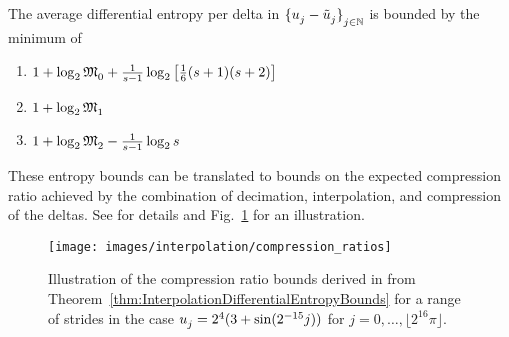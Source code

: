 \begin{theorem}
\label{thm:InterpolationDifferentialEntropyBounds}
The average differential entropy per delta in \(\InterpolationErrors\) is bounded by the minimum of
\begin{enumerate}[(1)]
\item \(1+\log_{2}\MaximumDifferenceGlobal{0}+\tfrac{1}{\stride-1}\log_{2}\big[\tfrac{1}{6}(\stride+1)(\stride+2)\big]\)
\item \(1+\log_{2}\MaximumDifferenceGlobal{1}\)
\item \(1+\log_{2}\MaximumDifferenceGlobal{2}-\tfrac{1}{\stride-1}\log_{2}\stride\)
\end{enumerate}
\end{theorem}

These entropy bounds can be translated to bounds on the expected compression ratio achieved by the combination of decimation, interpolation, and compression of the deltas.
See \cite{AinsworthWhitneyKlasky} for details and Fig.~\ref{fig:InterpolationCompressionRatioExample} for an illustration.

\begin{figure}[ht]
\centering
\texttt{[image: images/interpolation/compression\_ratios]}
\caption{%
Illustration of the compression ratio bounds derived in \cite{AinsworthWhitneyKlasky} from Theorem~\ref{thm:InterpolationDifferentialEntropyBounds} for a range of strides in the case \(\Datum{j}=2^{4}(3+\sin(2^{-15}j))\) for \(j=0,\ldots,\lfloor2^{16}\pi\rfloor\).%
}
\label{fig:InterpolationCompressionRatioExample}
\end{figure}
